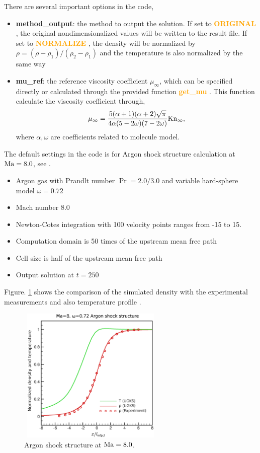 \documentclass[a4paper]{book}
\newcommand{\hi}[1]{
    \textbf{\textcolor{orange}{#1}}
}
\begin{document}
There are several important options in the code,
\begin{itemize}
    \item \textbf{method\_output}: the method to output the solution. If set to \hi{ORIGINAL}, the original nondimensionalized values will be written to the result file. If set to \hi{NORMALIZE}, the density will be normalized by $\rho = (\rho-\rho_1)/(\rho_2-\rho_1)$ and the temperature is also normalized by the same way
    \item \textbf{mu\_ref}: the reference viscosity coefficient $\mu_\infty$, which can be specified directly or calculated through the provided function \hi{get\_mu}. This function calculate the viscosity coefficient through,
        $$\mu_\infty = \frac{5(\alpha+1)(\alpha+2)\sqrt{\pi}}{4\alpha(5-2\omega)(7-2\omega)}{\rm Kn}_\infty,$$
        where $\alpha,\omega$ are coefficients related to molecule model. 
\end{itemize}

The default settings in the code is for Argon shock structure calculation at ${\rm Ma}=8.0$, see \cite{Xu2011}.
\begin{itemize}
    \item Argon gas with Prandlt number $\Pr=2.0/3.0$ and variable hard-sphere model $\omega=0.72$
    \item Mach number 8.0
    \item Newton-Cotes integration with 100 velocity points ranges from -15 to 15.
    \item Computation domain is 50 times of the upstream mean free path
    \item Cell size is half of the upstream mean free path
    \item Output solution at $t=250$
\end{itemize}

Figure. \ref{pic:shock_solution} shows the comparison of the simulated density with the experimental measurements \cite{Alsmeyer1976} and also temperature profile .

\begin{figure}[htb!]
    \centering
    \includegraphics[width=7cm,height=6.5cm]{shock_Ma8.eps}
    \caption{Argon shock structure at ${\rm Ma}=8.0$.}
    \label{pic:shock_solution}
\end{figure}
\end{document}
